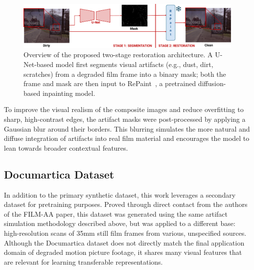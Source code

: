 \documentclass[10pt,a4paper,twocolumn,twoside]{article}
\begin{document}
\begin{figure}[t]
  \centering
    \includegraphics[width= \textwidth]{img/Diagrama_Two_Stage_BO.pdf}\vspace{-0.6em}
    \caption{ \small
Overview of the proposed two-stage restoration architecture. A U-Net-based model first segments visual artifacts (e.g., dust, dirt, scratches) from a degraded film frame into a binary mask; both the frame and mask are then input to RePaint~\cite{repaint}, a pretrained diffusion-based inpainting model.
}
    \label{fig:two-stage}
\end{figure}

To improve the visual realism of the composite images and reduce overfitting to sharp, high-contrast edges, the artifact masks were post-processed by applying a Gaussian blur around their borders. This blurring simulates the more natural and diffuse integration of artifacts into real film material and encourages the model to lean towards broader contextual features.
\subsection{Documartica Dataset}
In addition to the primary synthetic dataset, this work leverages a secondary dataset for pretraining purposes. Proved through direct contact from the authors of the FILM-AA paper, this dataset was generated using the same artifact simulation methodology described above, but was applied to a different base: high-resolution scans of 35mm still film frames from various, unspecified sources. \\ Although the Documartica dataset does not directly match the final application domain of degraded motion picture footage, it shares many visual features that are relevant for learning transferable representations.
\end{document}
